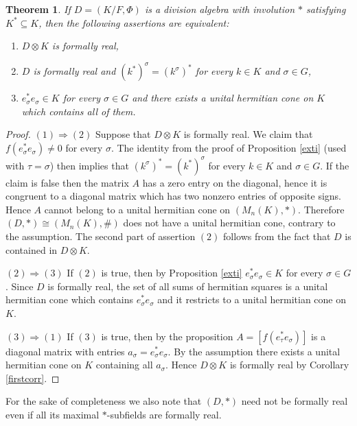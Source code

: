 \documentclass[12pt,reqno]{amsart}
\newtheorem{thm}{Theorem}
\theoremstyle{definition}
\begin{document}
\begin{thm}
\label{crossinvo}
If $D=(K/F,\Phi)$ is a division algebra with involution $\ast$
satisfying $K^\ast \subseteq K$, then the following assertions are equivalent:
\begin{enumerate}
\item $D \otimes K$ is formally real,
\item $D$ is formally real and $(k^\ast)^\sigma=(k^\sigma)^\ast$ for every $k \in K$ and $\sigma \in G$,
\item $e_\sigma^\ast e_\sigma \in K$ for every $\sigma \in G$ and there exists a 
unital hermitian cone on $K$ which contains all of them.
\end{enumerate}
\end{thm}

\begin{proof}
$(1) \Rightarrow (2)$ Suppose that $D \otimes K$ is formally real. 
We claim that $f(e_\sigma^\ast e_\sigma) \ne 0$ for every $\sigma$.
The identity from the proof of Proposition \ref{exti} (used with $\tau=\sigma$)
then implies that $(k^\sigma)^\ast= (k^\ast)^\sigma$
for every $k \in K$ and $\sigma \in G$. 
If the claim is false then the matrix $A$ has a zero entry on the diagonal,
hence it is congruent to a diagonal matrix which has two nonzero entries 
of opposite signs. Hence $A$ cannot belong to a unital hermitian cone on
$(M_n(K),\ast)$. Therefore $(D,\ast) \cong (M_n(K),\#)$ does not
have a unital hermitian cone, contrary to the assumption.
The second part of assertion $(2)$
follows from the fact that $D$ is contained in $D \otimes K$. 

$(2) \Rightarrow (3)$ If $(2)$ is true, then by Proposition \ref{exti}
$e_\sigma^\ast e_\sigma \in K$ for every $\sigma \in G$.
Since $D$ is formally real, the set of all sums of hermitian squares
is a unital hermitian cone which contains $e_\sigma^\ast e_\sigma$ 
and it restricts to a unital hermitian cone on $K$.

$(3) \Rightarrow (1)$ If $(3)$ is true, then by the proposition
$A = [f(e_\tau^\ast e_\sigma)]$ is a diagonal matrix with 
entries $a_\sigma = e_\sigma^\ast e_\sigma$. By the assumption
there exists a unital hermitian cone on $K$ containing all $a_\sigma$.
Hence $D \otimes K$ is formally real by Corollary \ref{firstcorr}.
\end{proof}

For the sake of completeness we also note that $(D,\ast)$ need not be formally real
even if all its maximal $\ast$-subfields are formally real.
\end{document}
